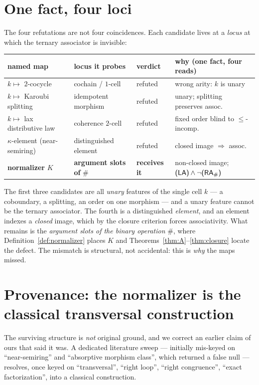 \documentclass[11pt]{amsart}
\theoremstyle{plain}
\theoremstyle{definition}
\theoremstyle{remark}
\newcommand{\sh}{\mathbin{\#}}
\newcommand{\LA}{\textsf{(LA)}}
\newcommand{\RA}{\textsf{(RA}\textsubscript{\#}\textsf{)}}
\begin{document}
\section{One fact, four loci}
\label{sec:synthesis}

The four refutations are not four coincidences. Each candidate lives at a \emph{locus} at which the
ternary associator is invisible:

\begin{center}
\begin{tabular}{llll}
\hline
named map & locus it probes & verdict & why (one fact, four reads) \\
\hline
$k\mapsto$ $2$-cocycle & cochain / $1$-cell & refuted & wrong arity: $k$ is unary \\
$k\mapsto$ Karoubi splitting & idempotent morphism & refuted & unary; splitting preserves assoc.\ \\
$k\mapsto$ lax distributive law & coherence $2$-cell & refuted & fixed order blind to $\le$-incomp.\\
$\kappa$-element (near-semiring) & distinguished element & refuted & closed image $\Rightarrow$ assoc.\ \\
\textbf{normalizer} $K$ & \textbf{argument slots of} $\sh$ & \textbf{receives it} & non-closed image; $\LA\wedge\neg\RA$\\
\hline
\end{tabular}
\end{center}

The first three candidates are all \emph{unary} features of the single cell $k$ --- a coboundary, a
splitting, an order on one morphism --- and a unary feature cannot be the ternary associator. The
fourth is a distinguished \emph{element}, and an element indexes a \emph{closed} image, which by the
closure criterion forces associativity. What remains is the \emph{argument slots of the binary
operation} $\sh$, where Definition~\ref{def:normalizer} places $K$ and
Theorems~\ref{thm:A}--\ref{thm:closure} locate the defect. The mismatch is structural, not
accidental: this is \emph{why} the maps missed.

\section{Provenance: the normalizer is the classical transversal construction}
\label{sec:provenance}

The surviving structure is \emph{not} original ground, and we correct an earlier claim of ours that
said it was. A dedicated literature sweep --- initially mis-keyed on ``near-semiring'' and
``absorptive morphism class'', which returned a false null --- resolves, once keyed on
``transversal'', ``right loop'', ``right congruence'', ``exact factorization'', into a classical
construction.
\end{document}
